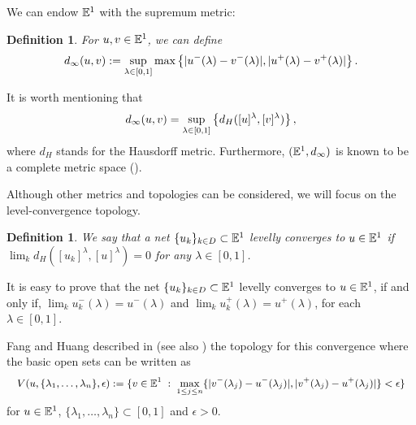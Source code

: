 \documentclass{amsart}
\newtheorem{definition}[theorem]{Definition}
\newcommand{\R}{{\mathbb{R}}}
\newcommand{\N}{{\mathbb{N}}}
\newcommand{\fn}{\mathbb{E}\sp{1}}
\begin{document}
We can endow $\fn$ with the supremum metric:

\begin{definition}{\rm \cite{GV}}\label{GW2}
 For $u, v\in\fn$, we can define
$$
d\sb{\infty}(u,v):=\sup\sb{\lambda\in [0,1]}\max\left\{|u\sp{-}(\lambda)-v\sp{
- } (\lambda)|, |u\sp{+}(\lambda)-v\sp{+} (\lambda)|\right \}.
$$

\end{definition}

It is worth mentioning that
$$
d\sb{\infty}(u,v)=\sup\sb{\lambda\in [0,1]}\left\{d_H([u]^{\lambda},[v]^{\lambda}) \right\},
$$
where $d_H$ stands for the Hausdorff metric. Furthermore,
$(\fn , d\sb{\infty})$ is known to be a complete metric
space (\cite{DK:1994}).







Although other metrics and topologies can be considered, we will focus on the level-convergence topology.

\begin{definition}
We say that a net $\{u_k\}_{k\in D} \subset \fn$ levelly converges to $u\in\fn$ if $\lim_k d_H([u_k]^{\lambda},[u]^{\lambda})=0$ for any $\lambda\in[0,1]$.
\end{definition}

It is easy to prove that the net $\{u_k\}_{k\in D} \subset \fn$ levelly converges to $u\in\fn$, if and only if, $\lim_k u_k^-(\lambda)=u^-(\lambda)$ and
 $\lim_k u_k^+(\lambda)=u^+(\lambda)$, for each $\lambda\in [0,1]$.

Fang and Huang described in \cite{FH:03} (see also \cite{FoMiSan}) the topology for this convergence  where the basic open sets can be written as
$$\text{\small $V(u,\{\lambda_1,\ldots,\lambda_n\},\epsilon):=
\{v\in\fn\; :\; \max_{1\leq j\leq n} \{|v^-(\lambda_j)-u^-(\lambda_j)|,
|v^+(\lambda_j)-u^+(\lambda_j)|\}<\epsilon\}$}$$
for $u\in\fn$, $\{\lambda_1,\ldots,\lambda_n\}\subset[0,1]$ and $\epsilon>0$.
\end{document}

